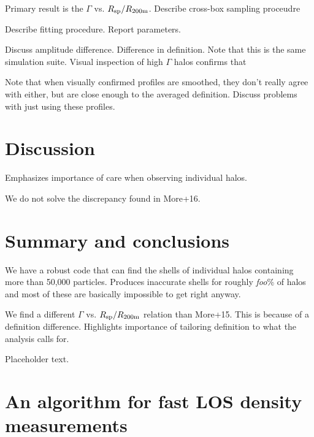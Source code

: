 \documentclass[numberedappendix,apj]{emulateapj}
\begin{document}
Primary result is the $\Gamma$ vs. $R_{\rm sp}/R_{\rm 200m}$. Describe cross-box
sampling proceudre

Describe fitting procedure. Report parameters.

Discuss amplitude difference. Difference in definition. Note that this is the
same simulation suite. Visual inspection of high $\Gamma$ halos confirms that

Note that when visually confirmed profiles are smoothed, they don't really
agree with either, but are close enough to the averaged definition. Discuss
problems with just using these profiles.
 
\section{Discussion}

Emphasizes importance of care when observing individual halos.

We do not solve the discrepancy found in More+16.

\section{Summary and conclusions}
\label{sec:summary}

We have a robust code that can find the shells of individual halos containing
more than 50,000 particles. Produces inaccurate shells for roughly
\emph{foo}\% of halos and most of these are basically impossible to get right
anyway.

We find a different $\Gamma$ vs. $R_{\rm sp}/R_{\rm 200m}$ relation than
More+15. This is because of a definition difference. Highlights importance of
tailoring definition to what the analysis calls for.

\acknowledgments

Placeholder text.




\appendix

\section{An algorithm for fast LOS density measurements}
\label{sec:intersection}
\end{document}
